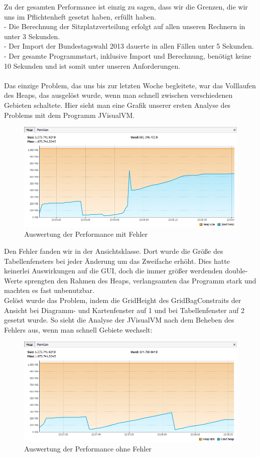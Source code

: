 \documentclass[12pt,a4paper,titlepage]{article}
\begin{document}
Zu der gesamten Performance ist einzig zu sagen, dass wir die Grenzen, die wir uns im Pflichtenheft gesetzt haben, erfüllt haben.\\
- Die Berechnung der Sitzplatzverteilung erfolgt auf allen unseren Rechnern in unter 3 Sekunden.\\
- Der Import der Bundestagswahl 2013 dauerte in allen Fällen unter 5 Sekunden.\\
- Der gesamte Programmstart, inklusive Import und Berechnung, benötigt keine 10 Sekunden und ist somit unter unseren Anforderungen. \\
\\
Das einzige Problem, das uns bis zur letzten Woche begleitete, war das Volllaufen des Heaps, das ausgelöst wurde, wenn man schnell zwischen verschiedenen Gebieten schaltete. Hier sieht man eine Grafik unserer ersten Analyse des Problems mit dem Programm JVisualVM.\\
\begin{figure}[!ht]
\centering
\includegraphics[scale=0.7]{mitFehler.png} \caption{Auswertung der Performance mit Fehler}
\end{figure}

Den Fehler fanden wir in der Ansichtsklasse. Dort wurde die Größe des Tabellenfensters bei jeder Änderung um das Zweifache erhöht. Dies hatte keinerlei Auswirkungen auf die GUI, doch die immer größer werdenden double-Werte sprengten den Rahmen des Heaps, verlangsamten das Programm stark und machten es fast unbenutzbar.\\
Gelöst wurde das Problem, indem die GridHeight des GridBagConstraits der Ansicht bei Diagramm- und Kartenfenster auf 1 und bei Tabellenfenster auf 2 gesetzt wurde. So sieht die Analyse der JVisualVM nach dem Beheben des Fehlers aus, wenn man schnell Gebiete wechselt:\\
\begin{figure}[!ht]
\centering
\includegraphics[scale=0.7]{ohneFehler.png} \caption{Auswertung der Performance ohne Fehler}
\end{figure}
\end{document}

